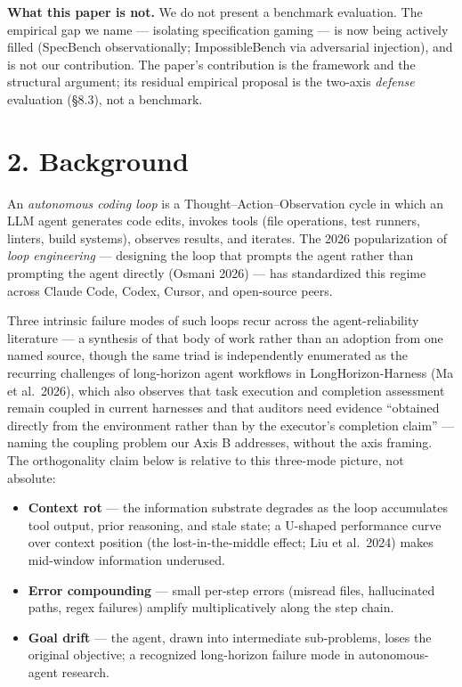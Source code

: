 \documentclass[
  11pt,
]{article}
\providecommand{\tightlist}{%
  \setlength{\itemsep}{0pt}\setlength{\parskip}{0pt}}
\begin{document}
\textbf{What this paper is not.} We do not present a benchmark
evaluation. The empirical gap we name --- isolating specification gaming
--- is now being actively filled (SpecBench observationally;
ImpossibleBench via adversarial injection), and is not our contribution.
The paper's contribution is the framework and the structural argument;
its residual empirical proposal is the two-axis \emph{defense}
evaluation (§8.3), not a benchmark.

\section{2. Background}\label{background}

An \emph{autonomous coding loop} is a Thought--Action--Observation cycle
in which an LLM agent generates code edits, invokes tools (file
operations, test runners, linters, build systems), observes results, and
iterates. The 2026 popularization of \emph{loop engineering} ---
designing the loop that prompts the agent rather than prompting the
agent directly (Osmani 2026) --- has standardized this regime across
Claude Code, Codex, Cursor, and open-source peers.

Three intrinsic failure modes of such loops recur across the
agent-reliability literature --- a synthesis of that body of work rather
than an adoption from one named source, though the same triad is
independently enumerated as the recurring challenges of long-horizon
agent workflows in LongHorizon-Harness (Ma et al.~2026), which also
observes that task execution and completion assessment remain coupled in
current harnesses and that auditors need evidence ``obtained directly
from the environment rather than by the executor's completion claim''
--- naming the coupling problem our Axis B addresses, without the axis
framing. The orthogonality claim below is relative to this three-mode
picture, not absolute:

\begin{itemize}
\tightlist
\item
  \textbf{Context rot} --- the information substrate degrades as the
  loop accumulates tool output, prior reasoning, and stale state; a
  U-shaped performance curve over context position (the
  lost-in-the-middle effect; Liu et al.~2024) makes mid-window
  information underused.
\item
  \textbf{Error compounding} --- small per-step errors (misread files,
  hallucinated paths, regex failures) amplify multiplicatively along the
  step chain.
\item
  \textbf{Goal drift} --- the agent, drawn into intermediate
  sub-problems, loses the original objective; a recognized long-horizon
  failure mode in autonomous-agent research.
\end{itemize}
\end{document}
